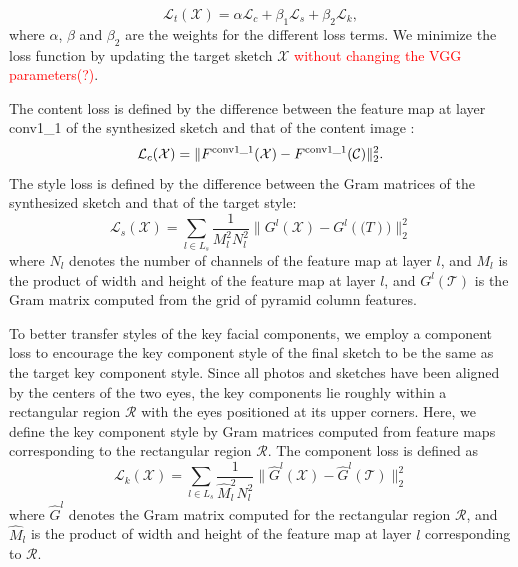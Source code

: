 \documentclass[10pt,twocolumn,letterpaper]{article}
\def\redn[#1]{\textcolor{red}{#1}}
\begin{document}
\begin{equation}
\mathcal{L}_{t}( \mathcal{X} ) = \alpha \mathcal{L}_{c} + \beta_1 \mathcal{L}_{s} + \beta_2 \mathcal{L}_{k},
\label{eq:Total_loss}
\end{equation}
where $\alpha$, $\beta$ and $\beta_2$ are the weights for the different loss terms.
We minimize the loss function by updating the target sketch $\mathcal{X}$ \redn[without changing the VGG parameters(?)].

The content loss is defined by the difference between the feature map at layer conv1\_1 of the synthesized sketch and that of the content image :
\begin{equation}
\mathcal{L}_{c}( \mathcal{X} ) = \| {{F^{\rm{conv1\_1}}}( \mathcal{X} ) - {F^{\rm{conv1\_1}}}( \mathcal{C} )} \|_2^2.
\label{eq:content_loss}
\end{equation}
The style loss is defined by the difference between the Gram matrices of the synthesized sketch and that of the target style:
\begin{equation}
\mathcal{L}_{s} ( \mathcal{X} ) = \sum\limits_{l \in {L_s}} {\frac{1}{{M_l^2N_l^2}}\| {{G^l}(\mathcal{X} ) - G^l(\mathcal(T))} \|_2^2} 
\label{eq:Gram_loss}
\end{equation}
where $N_l$ denotes the number of channels of the feature map at layer $l$, and $M_l$ is the product of width and height of the feature map at layer $l$, and $G^l(\mathcal{T})$ is the Gram matrix computed from the grid of pyramid column features.  

To better transfer styles of the key facial components, we employ a component loss to encourage the key component style of the final sketch to be the same as the target key component style. Since all photos and sketches have been aligned by the centers of the two eyes, the key components lie roughly within a rectangular region $\mathcal{R}$ with the eyes positioned at its upper corners. Here, we define the key component style by Gram matrices computed from feature maps corresponding to  the rectangular region $\mathcal{R}$. The component loss is defined as
\begin{equation}
\mathcal{L}_{k} ( \mathcal{X} ) = \sum\limits_{l \in {L_s}} {\frac{1}{{\hat{M}_l^2{N}_l^2}}\| {{{\hat G}^l}( \mathcal{X} ) - {\hat G}^l(\mathcal{T})} \|_2^2} 
\label{eq:component_loss}
\end{equation}
where $\hat G^l$ denotes the Gram matrix computed for the rectangular region $\mathcal R$, and $\hat{M}_l$ is the product of width and height of the feature map at layer $l$ corresponding to $\mathcal R$. 
\end{document}
